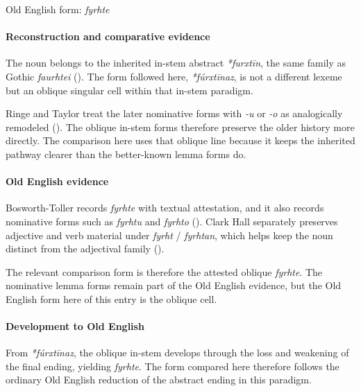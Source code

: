 \documentclass[
  british,
  a4paper,
]{article}
\begin{document}
Old English form: \emph{fyrhte}

\paragraph{Reconstruction and comparative
evidence}\label{reconstruction-and-comparative-evidence-44}

The noun belongs to the inherited in-stem abstract \emph{*furxtīn}, the
same family as Gothic \emph{faurhtei} (). The form followed here, \emph{*fúrxtīnaz}, is not a
different lexeme but an oblique singular cell within that in-stem
paradigm.

Ringe and Taylor treat the later nominative forms with \emph{-u} or
\emph{-o} as analogically remodeled
(). The
oblique in-stem forms therefore preserve the older history more
directly. The comparison here uses that oblique line because it keeps
the inherited pathway clearer than the better-known lemma forms do.

\paragraph{Old English evidence}\label{old-english-evidence-44}

Bosworth-Toller records \emph{fyrhte} with textual attestation, and it
also records nominative forms such as \emph{fyrhtu} and \emph{fyrhto}
().
Clark Hall separately preserves adjective and verb material under
\emph{fyrht} / \emph{fyrhtan}, which helps keep the noun distinct from
the adjectival family ().

The relevant comparison form is therefore the attested oblique
\emph{fyrhte}. The nominative lemma forms remain part of the Old English
evidence, but the Old English form here of this entry is the oblique
cell.

\paragraph{Development to Old
English}\label{development-to-old-english-44}

From \emph{*fúrxtīnaz}, the oblique in-stem develops through the loss
and weakening of the final ending, yielding \emph{fyrhte}. The form
compared here therefore follows the ordinary Old English reduction of
the abstract ending in this paradigm.
\end{document}
